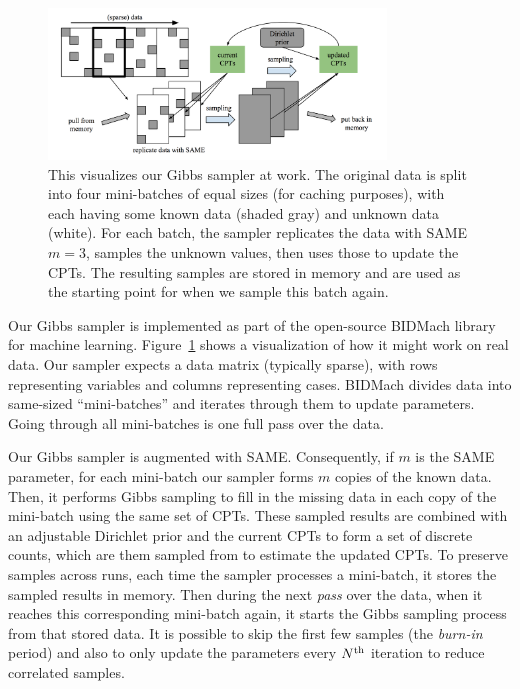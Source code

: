 \documentclass{article} %
\begin{document}
\begin{figure}[t]
\centering
\includegraphics[width=0.8\textwidth]{fig_BIDMach_final}
\caption{This visualizes our Gibbs sampler at work. The original data is split into four
mini-batches of equal sizes (for caching purposes), with each having some known data (shaded gray)
and unknown data (white). For each batch, the sampler replicates the data with SAME $m=3$, samples
the unknown values, then uses those to update the CPTs. The resulting samples are stored in memory
and are used as the starting point for when we sample this batch again.}
\label{fig:BIDMach}
\end{figure}

Our Gibbs sampler is implemented as part of the open-source BIDMach library~\citep{bidmach} for
machine learning.  Figure~\ref{fig:BIDMach} shows a visualization of how it might work on real data.
Our sampler expects a data matrix (typically sparse), with rows representing variables and columns
representing cases. BIDMach divides data into same-sized ``mini-batches'' and iterates through them
to update parameters. Going through all mini-batches is one full pass over the data.

Our Gibbs sampler is augmented with SAME. Consequently, if $m$ is the SAME parameter, for each
mini-batch our sampler forms $m$ copies of the known data.  Then, it performs Gibbs sampling to fill
in the missing data in each copy of the mini-batch using the same set of CPTs.  These sampled
results are combined with an adjustable Dirichlet prior and the current CPTs to form a set of
discrete counts, which are them sampled from to estimate the updated CPTs. To preserve samples
across runs, each time the sampler processes a mini-batch, it stores the sampled results in memory.
Then during the next \emph{pass} over the data, when it reaches this corresponding mini-batch again,
it starts the Gibbs sampling process from that stored data. It is possible to skip the first few
samples (the \emph{burn-in} period) and also to only update the parameters every $N^{\rm th}$
iteration to reduce correlated samples.
\end{document}
